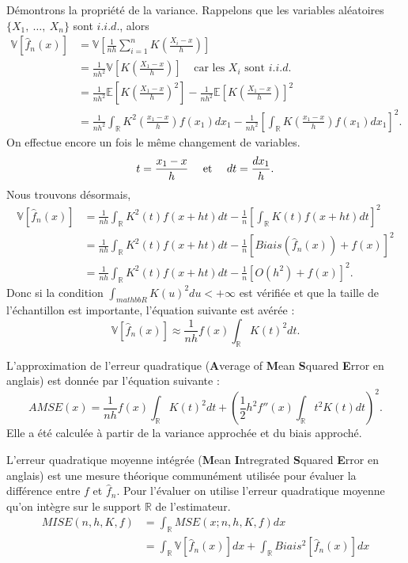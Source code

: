 \documentclass[
]{book}
\theoremstyle{definition}
\theoremstyle{definition}
\theoremstyle{definition}
\theoremstyle{definition}
\theoremstyle{remark}
\begin{document}
\begin{demo}
Démontrons la propriété de la variance.
Rappelons que les variables aléatoires $\{ X_1,~\dots, ~X_n\}$ sont $i.i.d.$, alors
$$
\begin{aligned}
\mathbb V  \left[ \hat f_n(x) \right] &= \mathbb V \left[ \frac1{nh} \sum\limits_{i=1}^n K\left(\frac{X_i-x}h\right) \right] \\
&= \frac1{nh^2} \mathbb V \left[  K\left(\frac{X_1-x}h\right) \right] ~~~~~\text{car les } X_i \text{ sont }i.i.d.\\
&= \frac1{nh^2} \mathbb E \left[  K\left(\frac{X_1-x}h\right)^2 \right] - \frac1{nh^2} \mathbb E \left[  K\left(\frac{X_1-x}h\right) \right]^2\\
&= \frac1{nh^2} \int_{\mathbb R}  K^2\left(\frac{x_1-x}h\right) f(x_1)dx_1 - \frac1{nh^2} \left[\int_{\mathbb R}  K\left(\frac{x_1-x}h\right) f(x_1)dx_1\right]^2.
\end{aligned}
$$
On effectue encore un fois le même changement de variables.
$$t=\frac{x_1-x}h ~~~~\hbox{et}~~~~dt =\frac{dx_1}h.$$
Nous trouvons désormais,
$$
\begin{aligned}
\mathbb V  \left[ \hat f_n(x) \right] &= \frac1{nh} \int_{\mathbb R}  K^2\left(t\right) f(x+ht)dt - \frac1{n} \left[\int_{\mathbb R}  K\left(t\right) f(x+ht)dt\right]^2\\
&= \frac1{nh} \int_{\mathbb R}  K^2\left(t\right) f(x+ht)dt - \frac1{n} \left[Biais \left( \hat f_n(x) \right) +f(x)\right]^2\\
&= \frac1{nh} \int_{\mathbb R}  K^2\left(t\right) f(x+ht)dt - \frac1{n} \left[O \left( h^2 \right) +f(x)\right]^2.
\end{aligned}
$$
Donc si la condition $\int_{mathbb R}K(u)^2du<+\infty$ est vérifiée et que la taille de l'échantillon est importante, l'équation suivante est avérée : 
$$\mathbb V \left[ \hat f_n(x) \right] \approx \frac1{nh} f(x) \int_{\mathbb R}K(t)^2 dt.$$

\end{demo}

L'approximation de l'erreur quadratique (\textbf{A}verage of \textbf{M}ean \textbf{S}quared \textbf{E}rror en anglais) est donnée par l'équation suivante :\\
\[
AMSE(x)= \frac1{nh} f(x) \int_{\mathbb R}K(t)^2 dt + \left(\frac12h^2f''(x)\int_{\mathbb R} t^2K(t) dt \right)^2.
\]
Elle a été calculée à partir de la variance approchée et du biais approché.

L'erreur quadratique moyenne intégrée (\textbf{M}ean \textbf{I}ntregrated \textbf{S}quared \textbf{E}rror en anglais) est une mesure théorique communément utilisée pour évaluer la différence entre \(f\) et \(\hat f_n\). Pour l'évaluer on utilise l'erreur quadratique moyenne qu'on intègre sur le support \(\mathbb R\) de l'estimateur.
\[
\begin{aligned}
MISE(n,h,K,f) &= \int_{\mathbb R}MSE(x;n,h,K,f)dx\\
&= \int_{\mathbb R} \mathbb V\left[ \hat f_n(x) \right]  dx+ \int_{\mathbb R} Biais^2 \left[ \hat f_n(x) \right]dx
\end{aligned}
\]
\end{document}
